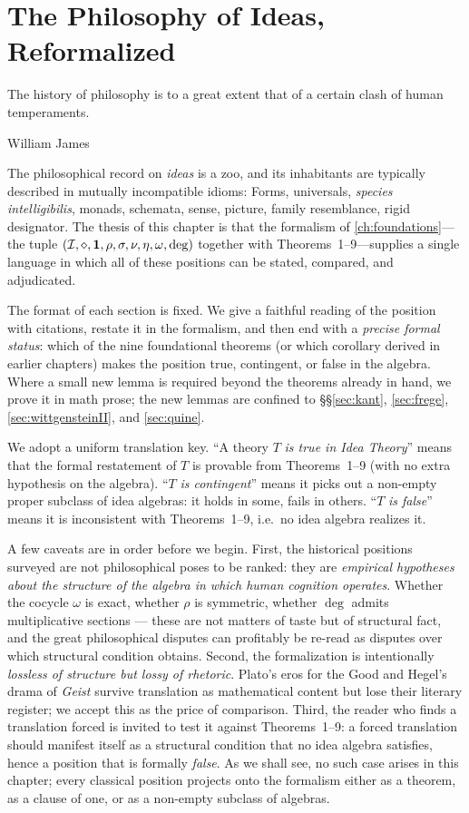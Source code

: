 \chapter{The Philosophy of Ideas, Reformalized}\label{ch:philosophy}

\epigraph{The history of philosophy is to a great extent that of a certain
clash of human temperaments.}{William James}

The philosophical record on \emph{ideas} is a zoo, and its inhabitants are
typically described in mutually incompatible idioms: Forms, universals,
\emph{species intelligibilis}, monads, schemata, sense, picture, family
resemblance, rigid designator. The thesis of this chapter is that the
formalism of \cref{ch:foundations}---the tuple
$(\mathcal{I},\mathbin{\diamond},\mathbf{1},\rho,\sigma,\nu,\eta,\omega,\deg)$ together with
Theorems~1--9---supplies a single language in which all of these positions
can be stated, compared, and adjudicated.

The format of each section is fixed. We give a faithful reading of the
position with citations, restate it in the formalism, and then end with a
\emph{precise formal status}: which of the nine foundational theorems (or
which corollary derived in earlier chapters) makes the position true,
contingent, or false in the algebra. Where a small new lemma is required
beyond the theorems already in hand, we prove it in math prose; the new
lemmas are confined to \S\S\ref{sec:kant}, \ref{sec:frege},
\ref{sec:wittgensteinII}, and \ref{sec:quine}.

We adopt a uniform translation key. ``A theory $T$ \emph{is true in Idea
Theory}'' means that the formal restatement of $T$ is provable from
Theorems~1--9 (with no extra hypothesis on the algebra). ``$T$ \emph{is
contingent}'' means it picks out a non-empty proper subclass of idea
algebras: it holds in some, fails in others. ``$T$ \emph{is false}'' means
it is inconsistent with Theorems~1--9, i.e.\ no idea algebra realizes it.

A few caveats are in order before we begin. First, the historical
positions surveyed are not philosophical poses to be ranked: they are
\emph{empirical hypotheses about the structure of the algebra in which
human cognition operates}. Whether the cocycle $\omega$ is exact, whether
$\rho$ is symmetric, whether $\deg$ admits multiplicative sections ---
these are not matters of taste but of structural fact, and the great
philosophical disputes can profitably be re-read as disputes over which
structural condition obtains. Second, the formalization is intentionally
\emph{lossless of structure but lossy of rhetoric}. Plato's eros for the
Good and Hegel's drama of \emph{Geist} survive translation as
mathematical content but lose their literary register; we accept this as
the price of comparison. Third, the reader who finds a translation
forced is invited to test it against Theorems~1--9: a forced translation
should manifest itself as a structural condition that no idea algebra
satisfies, hence a position that is formally \emph{false}. As we shall
see, no such case arises in this chapter; every classical position
projects onto the formalism either as a theorem, as a clause of one,
or as a non-empty subclass of algebras.


